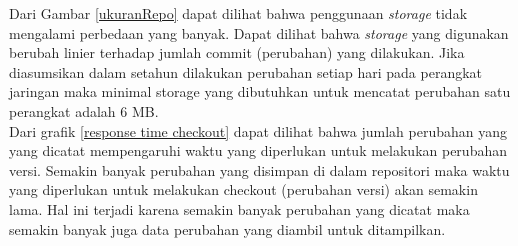     \indent Dari Gambar \ref{ukuranRepo} dapat dilihat bahwa penggunaan \textit{storage} tidak mengalami perbedaan yang banyak. Dapat dilihat bahwa \textit{storage} yang digunakan berubah linier terhadap jumlah commit (perubahan) yang dilakukan. Jika diasumsikan dalam setahun dilakukan perubahan setiap hari pada perangkat jaringan maka minimal storage yang dibutuhkan untuk mencatat perubahan satu perangkat adalah 6 MB.\\
    
    \indent Dari grafik \ref{response time checkout} dapat dilihat bahwa jumlah  perubahan yang yang dicatat mempengaruhi waktu yang diperlukan untuk melakukan perubahan versi. Semakin banyak perubahan yang disimpan di dalam repositori maka waktu yang diperlukan untuk melakukan checkout (perubahan versi) akan semakin lama. Hal ini terjadi karena semakin banyak perubahan yang dicatat maka semakin banyak juga data perubahan yang diambil untuk ditampilkan.
     
    	